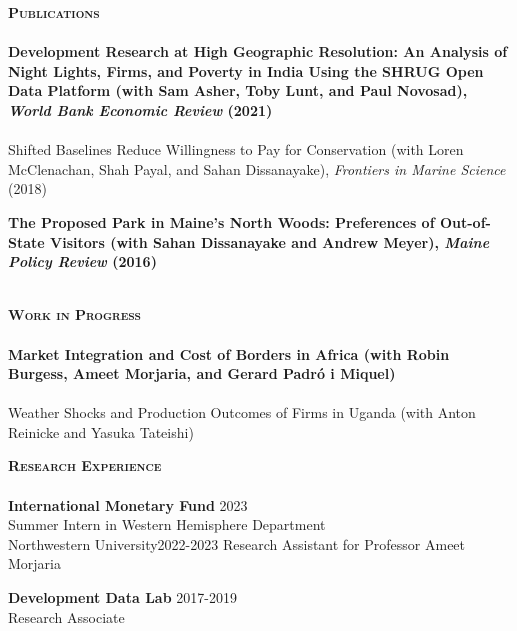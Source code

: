 \documentclass[11pt]{article}
\newcommand{\lineunder}{\vspace*{-8pt} \\ \hspace*{-18pt} \hrulefill \\}
\newcommand{\header}[1]{{\hspace*{-15pt}\vspace*{6pt} \textsc{#1}} \vspace*{-6pt} \lineunder}
\newcommand{\schoolwithcourses}[4]{
 \textbf{#1} \hfill{#2}\\
    #3\\
\vspace*{5pt}
}
\begin{document}
\header{\textbf{Publications}}
\schoolwithcourses{Development Research at High Geographic Resolution: An Analysis of Night Lights, Firms, and Poverty in India Using the SHRUG Open Data Platform \textnormal{(with Sam Asher, Toby Lunt, and Paul Novosad), \textit{World Bank Economic Review} (2021)}}{}{~\vspace{-3mm}}  

\schoolwithcourses{Shifted Baselines Reduce Willingness to Pay for Conservation \textnormal{(with Loren McClenachan, Shah Payal, and Sahan Dissanayake), \textit{Frontiers in Marine Science} (2018)}}{}{~\vspace{-3mm}} 

\schoolwithcourses{The Proposed Park in Maine's North Woods: Preferences of Out-of-State Visitors \textnormal{(with Sahan Dissanayake and Andrew Meyer), \textit{Maine Policy Review} (2016)}}{}{~\vspace{0mm}} 
\hfill{}

\newpage


\header{\textbf{Work in Progress}}

\schoolwithcourses{Market Integration and Cost of Borders in Africa \textnormal{(with Robin Burgess, Ameet Morjaria, and Gerard Padr\'{o} i Miquel)}}{}{~\vspace{-3mm}}

\schoolwithcourses{Weather Shocks and Production Outcomes of Firms in Uganda \textnormal{(with Anton Reinicke and Yasuka Tateishi)}}{}{~\vspace{-3mm}}{}




\header{\textbf{Research Experience}}
\schoolwithcourses{International Monetary Fund}{2023}{\hspace{2mm} Summer Intern in Western Hemisphere Department}

\schoolwithcourses{Northwestern University}{2022-2023}{\hspace{2mm} Research Assistant for Professor Ameet Morjaria}

\schoolwithcourses{Development Data Lab}{2017-2019}{\hspace{2mm} Research Associate}
\hfill{}
\vspace{1mm}
\end{document}
